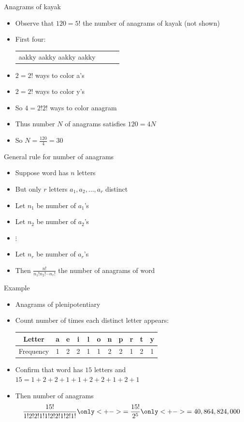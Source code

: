 \documentclass{beamer}
\theoremstyle{definition}
\begin{document}
\begin{frame}{Anagrams of kayak}
\begin{itemize}
\item Observe that $120=5!$ 
the number of anagrams of kay\alert{a}\alert{k} (not shown)
\item First four:
\begin{tabular}{cccc}
a\alert{a}k\alert{k}y
a\alert{a}\alert{k}ky
\alert{a}ak\alert{k}y
\alert{a}a\alert{k}ky
\end{tabular}
\item $2=2!$ ways to color a's
\item $2=2!$ ways to color y's
\item So $4=2!2!$ ways to color anagram
\item Thus number $N$ of anagrams satisfies
$120=4N$
\item So $N=\frac{120}{4}=30$
\end{itemize}
\end{frame}

\begin{frame}{General rule for number of anagrams}
\begin{itemize}
\item Suppose word has $n$ letters
\item But only $r$ letters $a_1,a_2,\ldots,a_r$ distinct 
\item Let $n_1$ be number of $a_1$'s
\item Let $n_2$ be number of $a_2$'s
\item $\vdots$
\item Let $n_r$ be number of $a_r$'s
\item Then $\frac{n!}{n_1!n_2!\cdots n_r!}$
the number of anagrams of word
\end{itemize}
\end{frame}

\begin{frame}{Example}
\begin{itemize}
\item Anagrams of \alert{plenipotentiary}
\item Count number of times each distinct letter appears:
\begin{tabular}{c|cccccccccc}
Letter&a&e&i&l&o&n&p&r&t&y\\\hline
Frequency&1&2&2&1&1&2&2&1&2&1
\end{tabular}
\item Confirm that word has $15$ letters and
$15=1+2+2+1+1+2+2+1+2+1$
\item Then number of anagrams
\[\frac{15!}{1!2!2!1!1!2!2!1!2!1!}
\only<+->{=\frac{15!}{2^5}}
\only<+->{=40,864,824,000}\]
\end{itemize}
\end{frame}
\end{document}
